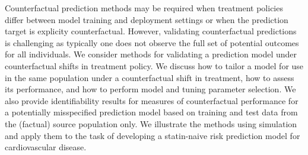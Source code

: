 Counterfactual prediction methods may be required when treatment policies differ between model training and deployment settings or when the prediction target is explicity counterfactual. However, validating counterfactual predictions is challenging as typically one does not observe the full set of potential outcomes for all individuals. We consider methods for validating a prediction model under counterfactual shifts in treatment policy. We discuss how to tailor a model for use in the same population under a counterfactual shift in treatment, how to assess its performance, and how to perform model and tuning parameter selection. We also provide identifiability results for measures of counterfactual performance for a potentially misspecified prediction model based on training and test data from the (factual) source population only. We illustrate the methods using simulation and apply them to the task of developing a statin-naive risk prediction model for cardiovascular disease. \\
